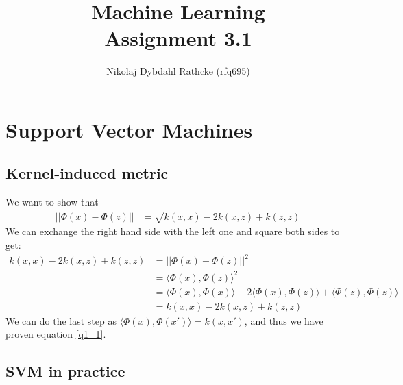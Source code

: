 \documentclass[a4paper]{article}
\author{Nikolaj Dybdahl Rathcke (rfq695)}
\title{Machine Learning \\ Assignment 3.1}
\def\dpip{|\!|}
\begin{document}
\maketitle

\section{Support Vector Machines}
\subsection{Kernel-induced metric}
We want to show that
\begin{align}\label{q1_1}
  \dpip \Phi(x)-\Phi(z) \dpip &= \sqrt{k(x,x)-2k(x,z)+k(z,z)}
\end{align}
We can exchange the right hand side with the left one and square both sides to get:
\begin{align*}
  k(x,x)-2k(x,z)+k(z,z) &=\dpip \Phi(x)-\Phi(z) \dpip^2 \\
  &= \langle \Phi(x), \Phi(z) \rangle ^2 \\
  &= \langle \Phi(x), \Phi(x)\rangle - 2\langle \Phi(x), \Phi(z)\rangle + \langle \Phi(z), \Phi(z)\rangle \\
  &= k(x,x) - 2k(x,z) + k(z,z)
\end{align*}
We can do the last step as $\langle \Phi(x), \Phi(x')\rangle = k(x,x')$, and thus we have proven equation \ref{q1_1}.

\subsection{SVM in practice}
\end{document}
